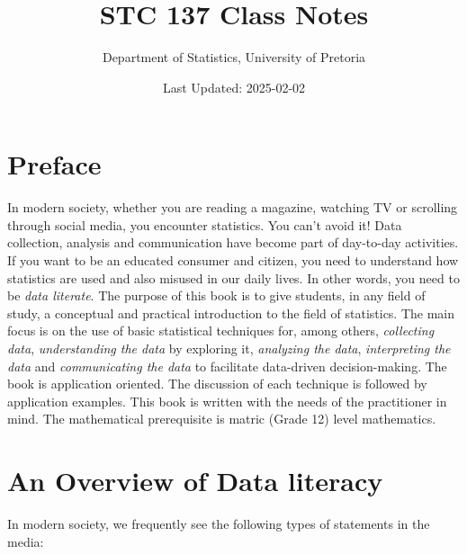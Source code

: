 \documentclass[
]{book}
\title{STC 137 Class Notes}
\author{Department of Statistics, University of Pretoria}
\date{Last Updated: 2025-02-02}
\begin{document}
\maketitle

{
\setcounter{tocdepth}{2}
\tableofcontents
}
\chapter*{Preface}\label{preface}

In modern society, whether you are reading a magazine, watching TV or scrolling through social media, you encounter statistics. You can't avoid it! Data collection, analysis and communication have become part of day-to-day activities. If you want to be an educated consumer and citizen, you need to understand how statistics are used and also misused in our daily lives. In other words, you need to be \emph{data literate}. The purpose of this book is to give students, in any field of study, a conceptual and practical introduction to the field of statistics. The main focus is on the use of basic statistical techniques for, among others, \emph{collecting data}, \emph{understanding the data} by exploring it, \emph{analyzing the data}, \emph{interpreting the data} and \emph{communicating the data} to facilitate data-driven decision-making. The book is application oriented. The discussion of each technique is followed by application examples. This book is written with the needs of the practitioner in mind. The mathematical prerequisite is matric (Grade 12) level mathematics.

\chapter{An Overview of Data literacy}\label{an-overview-of-data-literacy}

In modern society, we frequently see the following types of statements in the media:
\end{document}
